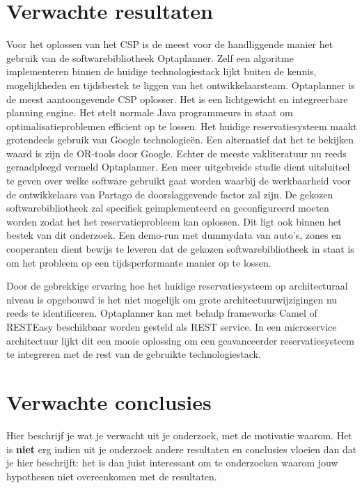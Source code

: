 \section{Verwachte resultaten}
\label{sec:verwachte_resultaten}
Voor het oplossen van het CSP is de meest voor de handliggende manier het gebruik van de softwarebibliotheek Optaplanner. Zelf een algoritme implementeren binnen de huidige technologiestack lijkt buiten de kennis, mogelijkheden en tijdsbestek te liggen van het ontwikkelaarsteam.
Optaplanner is de meest aantoongevende CSP oplosser. Het is een lichtgewicht en integreerbare planning engine. Het stelt normale Java programmeurs in staat om optimalisatieproblemen efficient op te lossen. \autocite{optaplanner} Het huidige reservatiesysteem maakt grotendeels gebruik van Google technologieën. Een alternatief dat het te bekijken waard is zijn de OR-tools door Google. \autocite{ortools} Echter de meeste vakliteratuur nu reeds geraadpleegd vermeld Optaplanner. Een meer uitgebreide studie dient uitsluitsel te geven over welke software gebruikt gaat worden waarbij de werkbaarheid voor de ontwikkelaars van Partago de doorslaggevende factor zal zijn. De gekozen softwarebibliotheek zal specifiek geimplementeerd en geconfigureerd moeten worden zodat het het reservatieprobleem kan oplossen. Dit ligt ook binnen het bestek van dit onderzoek. Een demo-run met dummydata van auto's, zones en cooperanten dient bewijs te leveren dat de gekozen softwarebibliotheek in staat is om het probleem op een tijdsperformante manier op te lossen. 

Door de gebrekkige ervaring hoe het huidige reservatiesysteem op architecturaal niveau is opgebouwd is het niet mogelijk om grote architectuurwijzigingen nu reeds te identificeren. Optaplanner kan met behulp frameworks Camel of RESTEasy beschikbaar worden gesteld als REST service. \autocite{manualoptaplanner} In een microservice architectuur lijkt dit een mooie oplossing om een geavanceerder reservatiesysteem te integreren met de rest van de gebruikte technologiestack.  





\section{Verwachte conclusies}
\label{sec:verwachte_conclusies}

Hier beschrijf je wat je verwacht uit je onderzoek, met de motivatie waarom. Het is \textbf{niet} erg indien uit je onderzoek andere resultaten en conclusies vloeien dan dat je hier beschrijft: het is dan juist interessant om te onderzoeken waarom jouw hypothesen niet overeenkomen met de resultaten.

